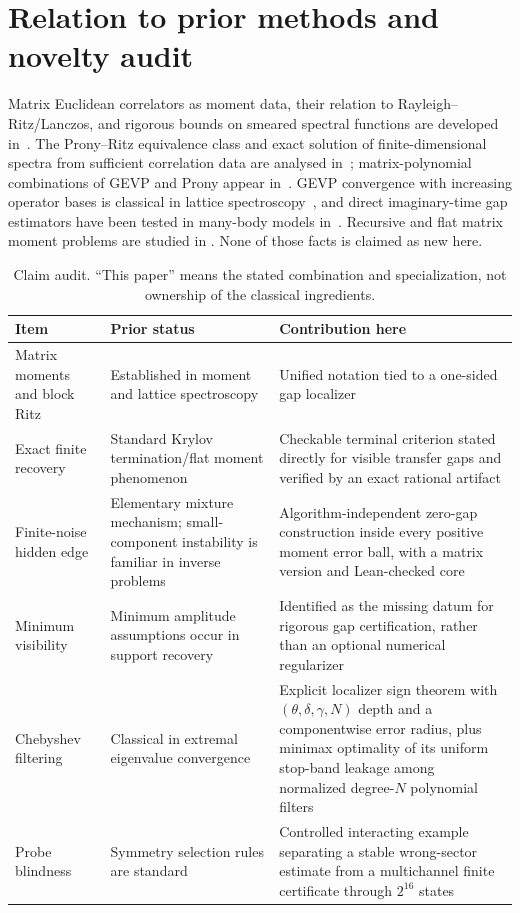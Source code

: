 \documentclass[11pt]{article}
\theoremstyle{definition}
\theoremstyle{remark}
\begin{document}
\section{Relation to prior methods and novelty audit}

Matrix Euclidean correlators as moment data, their relation to
Rayleigh--Ritz/Lanczos, and rigorous bounds on smeared spectral functions are
developed in~\cite{MomentMatrix2025}.  The Prony--Ritz equivalence class and
exact solution of finite-dimensional spectra from sufficient correlation data
are analysed in~\cite{FilteredRR}; matrix-polynomial combinations of GEVP and
Prony appear in~\cite{Fleming2023}.  GEVP convergence with increasing operator
bases is classical in lattice spectroscopy~\cite{Blossier2009}, and direct
imaginary-time gap estimators have been tested in many-body models
in~\cite{Leamer2023}.  Recursive and flat matrix moment problems are studied in
\cite{CurtoMatrix2022,CurtoExtremal2006,Madler2023}.  None of those facts is
claimed as new here.

\begin{table}[ht]
\centering
\small
\caption{Claim audit.  ``This paper'' means the stated combination and
specialization, not ownership of the classical ingredients.}
\begin{tabularx}{\linewidth}{>{\raggedright\arraybackslash}p{.28\linewidth}
>{\raggedright\arraybackslash}p{.32\linewidth}X}
\toprule
Item & Prior status & Contribution here\\
\midrule
Matrix moments and block Ritz & Established in moment and lattice spectroscopy
& Unified notation tied to a one-sided gap localizer\\
Exact finite recovery & Standard Krylov termination/flat moment phenomenon
& Checkable terminal criterion stated directly for visible transfer gaps and
verified by an exact rational artifact\\
Finite-noise hidden edge & Elementary mixture mechanism; small-component
instability is familiar in inverse problems
& Algorithm-independent zero-gap construction inside every positive moment
error ball, with a matrix version and Lean-checked core\\
Minimum visibility & Minimum amplitude assumptions occur in support recovery
& Identified as the missing datum for rigorous gap certification, rather than
an optional numerical regularizer\\
Chebyshev filtering & Classical in extremal eigenvalue convergence
& Explicit localizer sign theorem with $(\theta,\delta,\gamma,N)$ depth and a
componentwise error radius, plus minimax optimality of its uniform stop-band
leakage among normalized degree-$N$ polynomial filters\\
Probe blindness & Symmetry selection rules are standard
& Controlled interacting example separating a stable wrong-sector estimate
from a multichannel finite certificate through $2^{16}$ states\\
\bottomrule
\end{tabularx}
\end{table}
\end{document}
